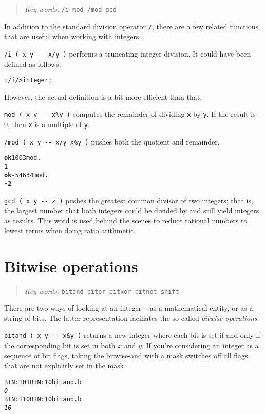 \documentclass[english]{book}
\newcommand{\chapkeywords}[1]{%
\begin{quote}
\emph{Key words:} \texttt{#1}
\end{quote}
}
\begin{document}
\chapkeywords{/i mod /mod gcd}

In addition to the standard division operator \texttt{/}, there are a few related functions that are useful when working with integers.

\texttt{/i ( x y -{}- x/y )} performs a truncating integer division. It could have been defined as follows:

\begin{alltt}
: /i / >integer ;
\end{alltt}

However, the actual definition is a bit more efficient than that.

\texttt{mod ( x y -{}- x\%y )} computes the remainder of dividing \texttt{x} by \texttt{y}. If the result is 0, then \texttt{x} is a multiple of \texttt{y}.

\texttt{/mod ( x y -{}- x/y x\%y )} pushes both the quotient and remainder.

\begin{alltt}
\textbf{ok} 100 3 mod .
\textbf{1}
\textbf{ok} -546 34 mod .
\textbf{-2}
\end{alltt}

\texttt{gcd ( x y -{}- z )} pushes the greatest common divisor of two integers; that is, the largest number that both integers could be divided by and still yield integers as results. This word is used behind the scenes to reduce rational numbers to lowest terms when doing ratio arithmetic.

\section{Bitwise operations}

\chapkeywords{bitand bitor bitxor bitnot shift}

There are two ways of looking at an integer -- as a mathematical entity, or as a string of bits. The latter representation faciliates the so-called \emph{bitwise operations}.

\texttt{bitand ( x y -{}- x\&y )} returns a new integer where each bit is set if and only if the corresponding bit is set in both $x$ and $y$. If you're considering an integer as a sequence of bit flags, taking the bitwise-and with a mask switches off all flags that are not explicitly set in the mask.

\begin{alltt}
BIN: 101 BIN: 10 bitand .b
\emph{0}
BIN: 110 BIN: 10 bitand .b
\emph{10}
\end{alltt}
\end{document}
